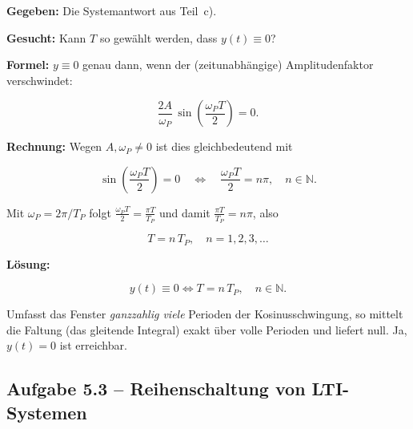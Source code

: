 \begin{beispiel}

\textbf{Gegeben:} Die Systemantwort aus Teil~c).

\textbf{Gesucht:} Kann $T$ so gewählt werden, dass $y(t) \equiv 0$?

\textbf{Formel:} $y \equiv 0$ genau dann, wenn der (zeitunabhängige)
Amplitudenfaktor verschwindet:

$$
\frac{2A}{\omega_P}\,\sin\!\left(\frac{\omega_P T}{2}\right) = 0.
$$

\textbf{Rechnung:} Wegen $A, \omega_P \neq 0$ ist dies gleichbedeutend mit

$$
\sin\!\left(\frac{\omega_P T}{2}\right) = 0
\quad\Longleftrightarrow\quad
\frac{\omega_P T}{2} = n\pi, \quad n \in \mathbb{N}.
$$

Mit $\omega_P = 2\pi/T_P$ folgt $\tfrac{\omega_P T}{2} = \tfrac{\pi T}{T_P}$ und
damit $\tfrac{\pi T}{T_P} = n\pi$, also

$$
T = n\,T_P, \quad n = 1, 2, 3, \dots
$$

\textbf{Lösung:}

$$
\boxed{\;y(t) \equiv 0 \iff T = n\,T_P,\quad n \in \mathbb{N}.\;}
$$

Umfasst das Fenster \emph{ganzzahlig viele} Perioden der Kosinusschwingung, so
mittelt die Faltung (das gleitende Integral) exakt über volle Perioden und
liefert null. Ja, $y(t) = 0$ ist erreichbar.

\end{beispiel}

\subsection*{Aufgabe 5.3 – Reihenschaltung von LTI-Systemen}

